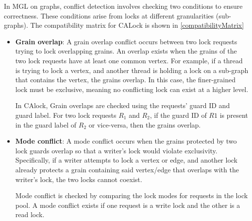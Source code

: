 In MGL on graphs, conflict detection involves checking two conditions to ensure correctness. These conditions arise from locks at different granularities (sub-graphs). The compatibility matrix for CALock is shown in \cref{compatibilityMatrix}
\begin{itemize}
	\item \textbf{Grain overlap}: A grain overlap conflict occurs between two lock requests trying to lock overlapping grains. An overlap exists when the grains of the two lock requests have at least one common vertex. For example, if a thread is trying to lock a vertex, and another thread is holding a lock on a sub-graph that contains the vertex, the grains overlap. In this case, the finer-grained lock must be exclusive, meaning no conflicting lock can exist at a higher level.
	
	In CAlock, Grain overlaps are checked using the requests' guard ID and guard label. For two lock requests $R_1$ and $R_2$, if the guard ID of $R1$ is present in the guard label of $R_2$ or vice-versa, then the grains overlap.
	
	\item \textbf{Mode conflict}: A mode conflict occurs when the grains protected by two lock guards overlap so that a writer's lock would violate exclusivity. Specifically, if a writer attempts to lock a vertex or edge, and another lock already protects a grain containing said vertex/edge that overlaps with the writer's lock, the two locks cannot coexist.
	
	Mode conflict is checked by comparing the lock modes for requests in the lock pool. A mode conflict exists if one request is a write lock and the other is a read lock.
\end{itemize}



